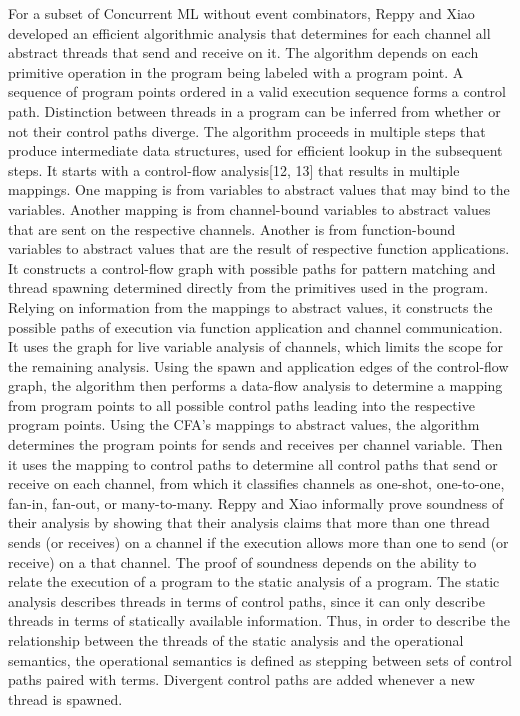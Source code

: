 \documentclass{article}
\begin{document}
  For a subset of Concurrent ML without event combinators, Reppy and  Xiao developed an efficient algorithmic analysis that determines for each channel all abstract threads that send and receive on it.  The algorithm depends on each primitive operation in the program being labeled with a program point.  A sequence of program points ordered in a valid execution sequence forms a control path.  Distinction between threads in a program can be inferred from whether or not their control paths diverge.  
	The algorithm proceeds in multiple steps that produce intermediate data structures, used for efficient lookup in the subsequent steps.  It starts with a control-flow analysis[12, 13] that results in multiple mappings. One mapping is from variables to abstract values that may bind to the variables.  Another mapping is from channel-bound variables to abstract values that are sent on the respective channels.  Another is from function-bound variables to abstract values that are the result of respective function applications.  It constructs a control-flow graph with possible paths for pattern matching and thread spawning determined directly from the primitives used in the program.  Relying on information from the mappings to abstract values, it constructs the possible paths of execution via function application and channel communication.  It uses the graph for live variable analysis of channels, which limits the scope for the remaining analysis.  Using the spawn and application edges of the control-flow graph, the algorithm then performs a data-flow analysis to determine a mapping from program points to all possible control paths leading into the respective program points.  Using the CFA's mappings to abstract values, the algorithm determines the program points for sends and receives per channel variable.  Then it uses the mapping to control paths to determine all control paths that send or receive on each channel, from which it classifies channels as one-shot, one-to-one, fan-in, fan-out, or many-to-many.
	Reppy and Xiao informally prove soundness of their analysis by showing that their analysis claims that more than one thread sends (or receives) on a channel if the execution allows more than one to send (or receive) on a that channel.  The proof of soundness depends on the ability to relate the execution of a program to the static analysis of a program.  The static analysis describes threads in terms of control paths, since it can only describe threads in terms of statically available information. Thus, in order to describe the relationship between the threads of the static analysis and the operational semantics, the operational semantics is defined as stepping between sets of control paths paired with terms.  Divergent control paths are added whenever a new thread is spawned.
\end{document}
